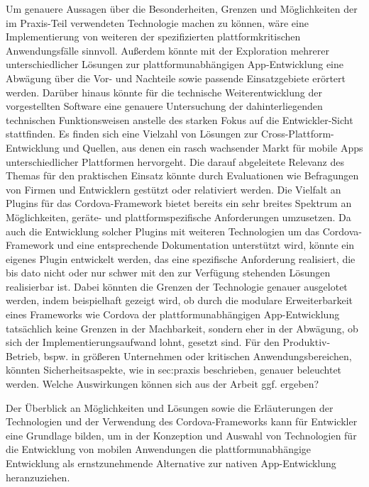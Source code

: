 Um genauere Aussagen über die Besonderheiten, Grenzen und Möglichkeiten  der im Praxis-Teil verwendeten Technologie machen zu können, wäre eine Implementierung von weiteren der spezifizierten plattformkritischen Anwendungsfälle sinnvoll.
Außerdem könnte mit der Exploration mehrerer unterschiedlicher Lösungen zur plattformunabhängigen App-Entwicklung eine Abwägung über die Vor- und Nachteile sowie passende Einsatzgebiete erörtert werden.
Darüber hinaus könnte für die technische Weiterentwicklung der vorgestellten Software eine genauere Untersuchung der dahinterliegenden technischen Funktionsweisen anstelle des starken Fokus auf die Entwickler-Sicht stattfinden.
Es finden sich eine Vielzahl von Lösungen zur Cross-Plattform-Entwicklung und Quellen, aus denen ein rasch wachsender Markt für mobile Apps unterschiedlicher Plattformen hervorgeht. Die darauf abgeleitete Relevanz des Themas für den praktischen Einsatz könnte durch Evaluationen wie Befragungen von Firmen und Entwicklern gestützt oder relativiert werden.
Die Vielfalt an Plugins für das Cordova-Framework bietet bereits ein sehr breites Spektrum an Möglichkeiten, geräte- und plattformspezifische Anforderungen umzusetzen. Da auch die Entwicklung solcher Plugins mit weiteren Technologien um das Cordova-Framework und eine entsprechende Dokumentation unterstützt wird, könnte ein eigenes Plugin entwickelt werden, das eine spezifische Anforderung realisiert, die bis dato nicht oder nur schwer mit den zur Verfügung stehenden Lösungen realisierbar ist.
Dabei könnten die Grenzen der Technologie genauer ausgelotet werden, indem beispielhaft gezeigt wird, ob durch die modulare Erweiterbarkeit eines Frameworks wie Cordova der plattformunabhängigen App-Entwicklung tatsächlich keine Grenzen in der Machbarkeit, sondern eher in der Abwägung, ob sich der Implementierungsaufwand lohnt, gesetzt sind.
Für den Produktiv-Betrieb, bspw. in größeren Unternehmen oder kritischen Anwendungsbereichen, könnten Sicherheitsaspekte, wie in {sec:praxis} beschrieben, genauer beleuchtet werden. 
Welche Auswirkungen können sich aus der Arbeit ggf. ergeben?


Der Überblick an Möglichkeiten und Lösungen sowie die Erläuterungen der Technologien und der Verwendung des Cordova-Frameworks kann für Entwickler eine Grundlage bilden, um in der Konzeption und Auswahl von Technologien für die Entwicklung von mobilen Anwendungen die plattformunabhängige Entwicklung als ernstzunehmende Alternative zur nativen App-Entwicklung heranzuziehen.

